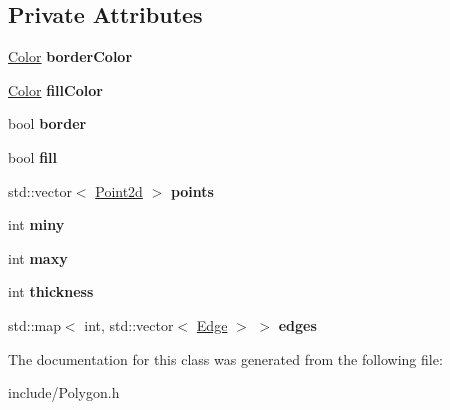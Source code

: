 \subsection*{Private Attributes}
\begin{DoxyCompactItemize}
\item 
\mbox{\label{classtiara_1_1Polygon_a960381ab34bd0f61b5f932f1c6897c74}} 
\mbox{\hyperlink{classtiara_1_1Color}{Color}} {\bfseries border\+Color}
\item 
\mbox{\label{classtiara_1_1Polygon_a2909b469fd9f83e0d604c84f14667820}} 
\mbox{\hyperlink{classtiara_1_1Color}{Color}} {\bfseries fill\+Color}
\item 
\mbox{\label{classtiara_1_1Polygon_a211c7a6202d9d32ba8683ffda1bec7e3}} 
bool {\bfseries border}
\item 
\mbox{\label{classtiara_1_1Polygon_ac90129cd7ac7dc6350ea68221b7d0c69}} 
bool {\bfseries fill}
\item 
\mbox{\label{classtiara_1_1Polygon_ad5ac3b48d126711041b7746cb8bca821}} 
std\+::vector$<$ \mbox{\hyperlink{classtiara_1_1Point2d}{Point2d}} $>$ {\bfseries points}
\item 
\mbox{\label{classtiara_1_1Polygon_aaef500ea7d59fe4ab9e64d98bb3f2db4}} 
int {\bfseries miny}
\item 
\mbox{\label{classtiara_1_1Polygon_a183e77c99f4976a7149913ec486c48a1}} 
int {\bfseries maxy}
\item 
\mbox{\label{classtiara_1_1Polygon_a5f5496bf58176512113e3e2e69a286cb}} 
int {\bfseries thickness}
\item 
\mbox{\label{classtiara_1_1Polygon_a4fbb09c4d53ddd64ae868cc2cd021286}} 
std\+::map$<$ int, std\+::vector$<$ \mbox{\hyperlink{classtiara_1_1Edge}{Edge}} $>$ $>$ {\bfseries edges}
\end{DoxyCompactItemize}


The documentation for this class was generated from the following file\+:\begin{DoxyCompactItemize}
\item 
include/Polygon.\+h\end{DoxyCompactItemize}
